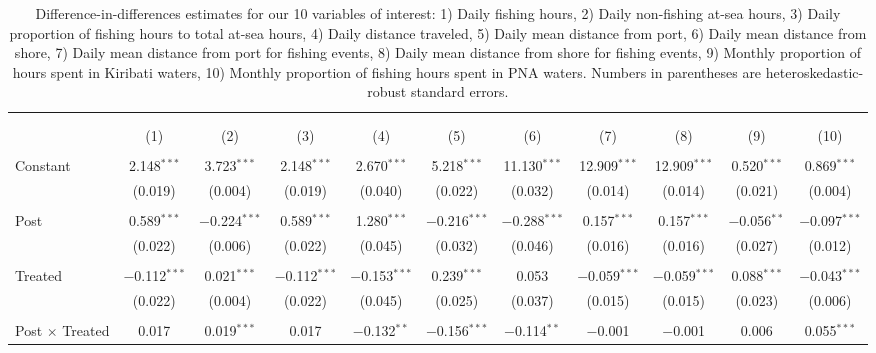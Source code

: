 
\begin{table}[!htbp] \centering 
  \caption{\label{tab:did}Difference-in-differences estimates for our 10 variables of interest: 1) Daily fishing hours, 2) Daily non-fishing at-sea hours, 3) Daily proportion of fishing hours to total at-sea hours, 4) Daily distance traveled, 5) Daily mean distance from port, 6) Daily mean distance from shore, 7) Daily mean distance from port for fishing events, 8) Daily mean distance from shore for fishing events, 9) Monthly proportion of hours spent in Kiribati waters, 10) Monthly proportion of fishing hours spent in PNA waters. Numbers in parentheses are heteroskedastic-robust standard errors.} 
  \label{} 
\footnotesize 
\begin{tabular}{@{\extracolsep{1pt}}lcccccccccc} 
\\[-1.8ex]\hline 
\hline \\[-1.8ex] 
\\[-1.8ex] & (1) & (2) & (3) & (4) & (5) & (6) & (7) & (8) & (9) & (10)\\ 
\hline \\[-1.8ex] 
 Constant & 2.148$^{***}$ & 3.723$^{***}$ & 2.148$^{***}$ & 2.670$^{***}$ & 5.218$^{***}$ & 11.130$^{***}$ & 12.909$^{***}$ & 12.909$^{***}$ & 0.520$^{***}$ & 0.869$^{***}$ \\ 
  & (0.019) & (0.004) & (0.019) & (0.040) & (0.022) & (0.032) & (0.014) & (0.014) & (0.021) & (0.004) \\ 
  & & & & & & & & & & \\ 
 Post & 0.589$^{***}$ & $-$0.224$^{***}$ & 0.589$^{***}$ & 1.280$^{***}$ & $-$0.216$^{***}$ & $-$0.288$^{***}$ & 0.157$^{***}$ & 0.157$^{***}$ & $-$0.056$^{**}$ & $-$0.097$^{***}$ \\ 
  & (0.022) & (0.006) & (0.022) & (0.045) & (0.032) & (0.046) & (0.016) & (0.016) & (0.027) & (0.012) \\ 
  & & & & & & & & & & \\ 
 Treated & $-$0.112$^{***}$ & 0.021$^{***}$ & $-$0.112$^{***}$ & $-$0.153$^{***}$ & 0.239$^{***}$ & 0.053 & $-$0.059$^{***}$ & $-$0.059$^{***}$ & 0.088$^{***}$ & $-$0.043$^{***}$ \\ 
  & (0.022) & (0.004) & (0.022) & (0.045) & (0.025) & (0.037) & (0.015) & (0.015) & (0.023) & (0.006) \\ 
  & & & & & & & & & & \\ 
 Post $\times$ Treated & 0.017 & 0.019$^{***}$ & 0.017 & $-$0.132$^{**}$ & $-$0.156$^{***}$ & $-$0.114$^{**}$ & $-$0.001 & $-$0.001 & 0.006 & 0.055$^{***}$ \\ 

\end{tabular}
\end{table}
